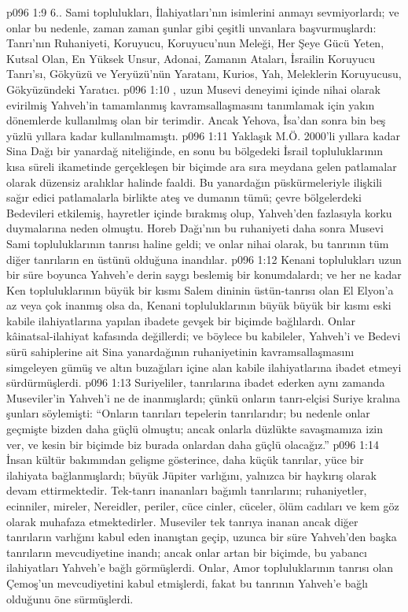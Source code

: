 \vs p096 1:9 6.. Sami toplulukları, İlahiyatları’nın isimlerini anmayı sevmiyorlardı; ve onlar bu nedenle, zaman zaman şunlar gibi çeşitli unvanlara başvurmuşlardı: Tanrı’nın Ruhaniyeti, Koruyucu, Koruyucu’nun Meleği, Her Şeye Gücü Yeten, Kutsal Olan, En Yüksek Unsur, Adonai, Zamanın Ataları, İsrailin Koruyucu Tanrı’sı, Gökyüzü ve Yeryüzü’nün Yaratanı, Kurios, Yah, Meleklerin Koruyucusu, Gökyüzündeki Yaratıcı.
\vs p096 1:10 , uzun Musevi deneyimi içinde nihai olarak evirilmiş Yahveh’in tamamlanmış kavramsallaşmasını tanımlamak için yakın dönemlerde kullanılmış olan bir terimdir. Ancak Yehova, İsa’dan sonra bin beş yüzlü yıllara kadar kullanılmamıştı.
\vs p096 1:11 Yaklaşık M.Ö. 2000’li yıllara kadar Sina Dağı bir yanardağ niteliğinde, en sonu bu bölgedeki İsrail topluluklarının kısa süreli ikametinde gerçekleşen bir biçimde ara sıra meydana gelen patlamalar olarak düzensiz aralıklar halinde faaldi. Bu yanardağın püskürmeleriyle ilişkili sağır edici patlamalarla birlikte ateş ve dumanın tümü; çevre bölgelerdeki Bedevileri etkilemiş, hayretler içinde bırakmış olup, Yahveh’den fazlasıyla korku duymalarına neden olmuştu. Horeb Dağı’nın bu ruhaniyeti daha sonra Musevi Sami topluluklarının tanrısı haline geldi; ve onlar nihai olarak, bu tanrının tüm diğer tanrıların en üstünü olduğuna inandılar.
\vs p096 1:12 Kenani toplulukları uzun bir süre boyunca Yahveh’e derin saygı beslemiş bir konumdalardı; ve her ne kadar Ken topluluklarının büyük bir kısmı Salem dininin üstün\hyp{}tanrısı olan El Elyon’a az veya çok inanmış olsa da, Kenani topluluklarının büyük büyük bir kısmı eski kabile ilahiyatlarına yapılan ibadete gevşek bir biçimde bağlılardı. Onlar kâinatsal\hyp{}ilahiyat kafasında değillerdi; ve böylece bu kabileler, Yahveh’i ve Bedevi sürü sahiplerine ait Sina yanardağının ruhaniyetinin kavramsallaşmasını simgeleyen gümüş ve altın buzağıları içine alan kabile ilahiyatlarına ibadet etmeyi sürdürmüşlerdi.
\vs p096 1:13 Suriyeliler, tanrılarına ibadet ederken aynı zamanda Museviler’in Yahveh’i ne de inanmışlardı; çünkü onların tanrı\hyp{}elçisi Suriye kralına şunları söylemişti: “Onların tanrıları tepelerin tanrılarıdır; bu nedenle onlar geçmişte bizden daha güçlü olmuştu; ancak onlarla düzlükte savaşmamıza izin ver, ve kesin bir biçimde biz burada onlardan daha güçlü olacağız.”
\vs p096 1:14 İnsan kültür bakımından gelişme gösterince, daha küçük tanrılar, yüce bir ilahiyata bağlanmışlardı; büyük Jüpiter varlığını, yalnızca bir haykırış olarak devam ettirmektedir. Tek\hyp{}tanrı inananları bağımlı tanrılarını; ruhaniyetler, ecinniler, mireler, Nereidler, periler, cüce cinler, cüceler, ölüm cadıları ve kem göz olarak muhafaza etmektedirler. Museviler tek tanrıya inanan ancak diğer tanrıların varlığını kabul eden inanıştan geçip, uzunca bir süre Yahveh’den başka tanrıların mevcudiyetine inandı; ancak onlar artan bir biçimde, bu yabancı ilahiyatları Yahveh’e bağlı görmüşlerdi. Onlar, Amor topluluklarının tanrısı olan Çemoş’un mevcudiyetini kabul etmişlerdi, fakat bu tanrının Yahveh’e bağlı olduğunu öne sürmüşlerdi.
